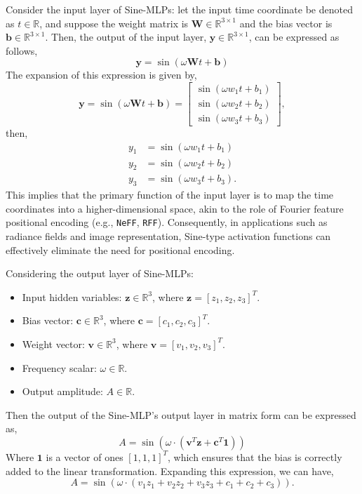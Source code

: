 \documentclass[letterpaper]{article} %
\begin{document}
Consider the input layer of Sine-MLPs: let the input time coordinate be denoted as \(t \in \mathbb{R}\), and suppose the weight matrix is \(\mathbf{W} \in \mathbb{R}^{3\times 1}\) and the bias vector is \(\mathbf{b} \in \mathbb{R}^{3\times 1}\). Then, the output of the input layer, \(\mathbf{y} \in \mathbb{R}^{3\times 1}\), can be expressed as follows,
$$
\mathbf{y} = \sin(\omega \mathbf{W} t + \mathbf{b})
$$ 
The expansion of this expression is given by, 
$$
\mathbf{y} = \sin(\omega \mathbf{W} t + \mathbf{b}) = \begin{bmatrix} \sin(\omega w_1 t + b_1) \\ \sin(\omega w_2 t + b_2) \\ \sin(\omega w_3 t + b_3) \end{bmatrix},
$$then,
\begin{equation}
\label{eq:sine_input}
    \begin{aligned}
        y_1 &= \sin(\omega w_1 t + b_1) \\
        y_2 &= \sin(\omega w_2 t + b_2) \\
        y_3 &= \sin(\omega w_3 t + b_3). 
    \end{aligned}
\end{equation}
This implies that the primary function of the input layer is to map the time coordinates into a higher-dimensional space, akin to the role of Fourier feature positional encoding (e.g., \texttt{NeFF}, \texttt{RFF}). Consequently, in applications such as radiance fields and image representation, Sine-type activation functions can effectively eliminate the need for positional encoding.

Considering the output layer of Sine-MLPs: 
\begin{itemize}
    \item Input hidden variables:  \(\mathbf{z} \in \mathbb{R}^3\), where \(\mathbf{z} = [z_1, z_2, z_3]^T \).
    \item Bias vector: \(\mathbf{c} \in \mathbb{R}^3\), where \(\mathbf{c} = [c_1, c_2, c_3]^T\).
    \item Weight vector: \(\mathbf{v} \in \mathbb{R}^3\), where \(\mathbf{v} =[v_1, v_2, v_3]^T\).
    \item Frequency scalar: \(\omega \in \mathbb{R}\).
    \item Output amplitude: \(A \in \mathbb{R}\).
\end{itemize}
Then the output of the Sine-MLP's output layer in matrix form can be expressed as,
$$
A = \sin(\omega \cdot (\mathbf{v}^T \mathbf{z} + \mathbf{c}^T \mathbf{1}))
$$ Where \(\mathbf{1}\) is a vector of ones \([1, 1, 1]^T\), which ensures that the bias is correctly added to the linear transformation. Expanding this expression, we can have,
\begin{equation}
\label{eq:sine_output}
    A = \sin(\omega \cdot (v_1 z_1 + v_2 z_2 + v_3 z_3 + c_1 + c_2 + c_3)).
\end{equation}
\end{document}
